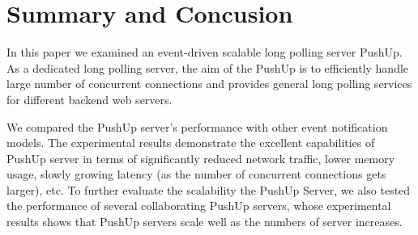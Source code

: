 \section{Summary and Concusion\\}

In this paper we examined an event-driven scalable long polling server PushUp.
As a dedicated long polling server, the aim of the PushUp is to efficiently
handle large number of concurrent connections and provides general long 
polling services for different backend web servers.

We compared the PushUp server's performance with other event notification 
models. The experimental results demonstrate the excellent capabilities of 
PushUp server in terms of significantly reduced network traffic, lower memory 
usage, slowly growing latency (as the number of concurrent connections gets 
larger), etc. To further evaluate the scalability the PushUp Server, we also
tested the performance of several collaborating PushUp servers, whose 
experimental results shows that PushUp servers scale well as the numbers of
server increases.

